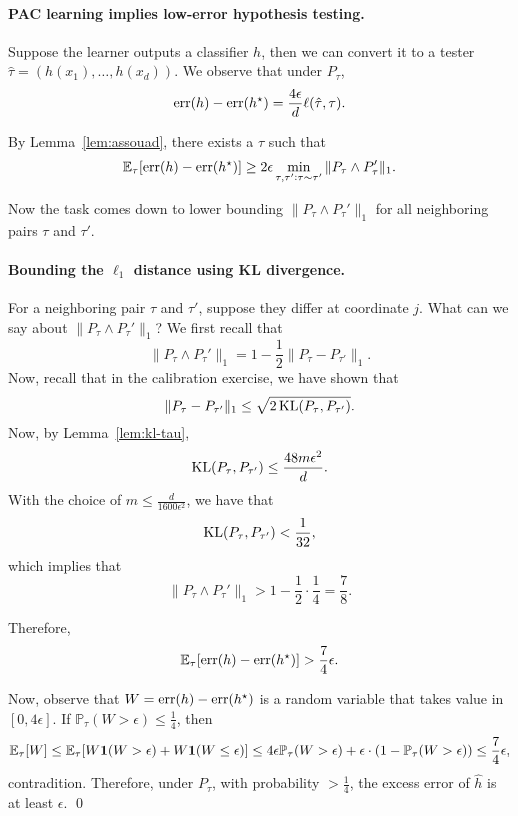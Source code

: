 \documentclass{article}
\DeclareMathOperator*{\KL}{{\rm KL}}
\DeclareMathOperator*{\err}{{\rm err}}
\newcommand{\EE}{\mathbb{E}}
\newcommand{\PP}{\mathbb{P}}
\newcommand*{\one}{{\bf 1}}
\begin{document}
\paragraph{PAC learning implies low-error hypothesis testing.} Suppose the learner outputs a classifier $h$, then we can convert it to a tester $\hat{\tau} = (h(x_1), \ldots, h(x_d))$.
We observe that under $P_\tau$,
\[ \err(h) - \err(h^\star) = \frac{4\epsilon}{d} \ell(\hat{\tau}, \tau). \]

By Lemma~\ref{lem:assouad}, there exists a $\tau$ such that
\[ \EE_\tau[\err(h) - \err(h^\star)] \geq 2 \epsilon \min_{\tau, \tau': \tau \sim \tau'} \| P_\tau \wedge P_\tau' \|_1. \]

Now the task comes down to lower bounding $\| P_\tau \wedge P_\tau' \|_1$ for all neighboring
pairs $\tau$ and $\tau'$.

\paragraph{Bounding the $\ell_1$ distance using KL divergence.}
For a neighboring pair $\tau$ and $\tau'$, suppose they differ at coordinate $j$.
What can we say about $\| P_\tau \wedge P_\tau' \|_1$? We first recall that
\[ \| P_\tau \wedge P_\tau' \|_1 = 1 - \frac12 \| P_{\tau} - P_{\tau'} \|_1. \]
Now, recall that in the calibration exercise, we have shown that
\[ \| P_{\tau} - P_{\tau'} \|_1 \leq \sqrt{2 \KL(P_{\tau}, P_{\tau'})}. \]
Now, by Lemma~\ref{lem:kl-tau},
\[ \KL(P_{\tau}, P_{\tau'}) \leq \frac{48 m \epsilon^2}{d}. \]
With the choice of $m \leq \frac{d}{1600\epsilon^2}$, we have that
\[ \KL(P_{\tau}, P_{\tau'}) < \frac{1}{32}, \]
which implies that
\[ \| P_\tau \wedge P_\tau' \|_1 > 1 - \frac12 \cdot \frac14 = \frac 78. \]

Therefore,
\[ \EE_\tau[\err(h) - \err(h^\star)] > \frac 74 \epsilon. \]

Now, observe that $W = \err(h) - \err(h^\star)$ is a random variable that takes value
in $[0, 4\epsilon]$. If $\PP_\tau(W > \epsilon) \leq \frac 1 4$,
then
\begin{eqnarray*}
  \EE_\tau[W]
  \leq \EE_\tau[W \one(W > \epsilon) + W \one(W \leq \epsilon)]
  \leq 4 \epsilon \PP_\tau(W > \epsilon) + \epsilon \cdot (1-\PP_\tau(W > \epsilon))
  \leq \frac 7 4 \epsilon,
\end{eqnarray*}
contradition. Therefore, under $P_\tau$, with probability $> \frac 1 4$,
the excess error of $\hat{h}$ is at least $\epsilon$. \qed
\end{document}
